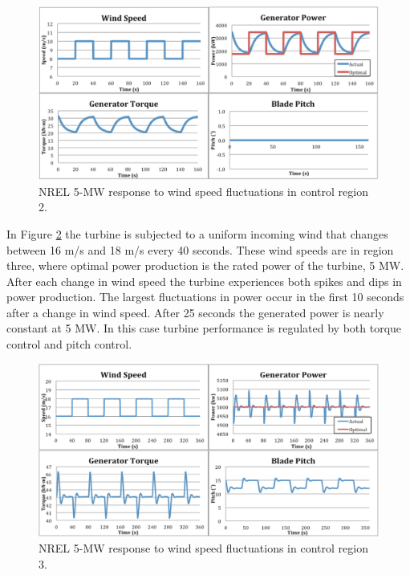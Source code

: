 \begin{figure}[htbp]
	\centering
		\includegraphics[width=\linewidth]{Figures/ch3Figures/fig3-3.png}
		
	\caption{NREL 5-MW response to wind speed fluctuations in control region 2.}
	\label{fig3-3}
\end{figure}

In Figure \ref{fig3-4} the turbine is subjected to a uniform incoming wind that changes between 16 m/s and 18 m/s every 40 seconds. These wind speeds are in region three, where optimal power production is the rated power of the turbine, 5 MW. After each change in wind speed the turbine experiences both spikes and dips in power production.  The largest fluctuations in power occur in the first 10 seconds after a change in wind speed. After 25 seconds the generated power is nearly constant at 5 MW.  In this case turbine performance is regulated by both torque control and pitch control. 

\begin{figure}[htbp]
	\centering
		\includegraphics[width=\linewidth]{Figures/ch3Figures/fig3-4.png}
		
	\caption{NREL 5-MW response to wind speed fluctuations in control region 3.}
	\label{fig3-4}
\end{figure}

